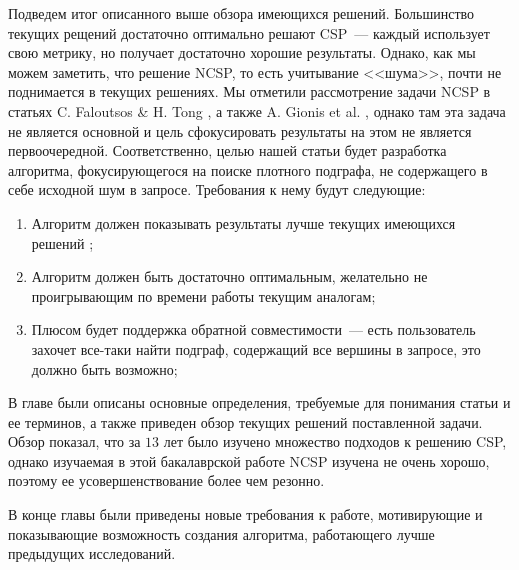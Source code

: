 Подведем итог описанного выше обзора имеющихся решений. Большинство текущих рещений достаточно оптимально решают CSP~--- каждый использует свою метрику, но получает достаточно хорошие результаты. Однако, как мы можем заметить, что решение NCSP, то есть учитывание <<шума>>, почти не поднимается в текущих решениях. Мы отметили рассмотрение задачи NCSP в статьях C. Faloutsos \& H. Tong \cite{Faloutsos06}, а также A. Gionis et al. \cite{Gionis15}, однако там эта задача не является основной и цель сфокусировать результаты на этом не является первоочередной. Соответственно, целью нашей статьи будет разработка алгоритма, фокусирующегося на поиске плотного подграфа, не содержащего в себе исходной шум в запросе. Требования к нему будут следующие:
\begin{enumerate}
  \item Алгоритм должен показывать результаты лучше текущих имеющихся решений \cite{Faloutsos06, Gionis15, Barbieri15};
  \item Алгоритм должен быть достаточно оптимальным, желательно не проигрывающим по времени работы текущим аналогам;
  \item Плюсом будет поддержка обратной совместимости~--- есть пользователь захочет все-таки найти подграф, содержащий все вершины в запросе, это должно быть возможно;
\end{enumerate}

\finishrelatedwork

\chapterconclusion

В главе были описаны основные определения, требуемые для понимания статьи и ее терминов, а также приведен обзор текущих решений поставленной задачи. Обзор показал, что за $13$ лет было изучено множество подходов к решению CSP, однако изучаемая в этой бакалаврской работе NCSP изучена не очень хорошо, поэтому ее усовершенствование более чем резонно. 

В конце главы были приведены новые требования к работе, мотивирующие и показывающие возможность создания алгоритма, работающего лучше предыдущих исследований.